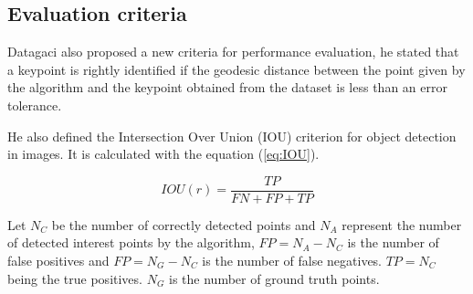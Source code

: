 \documentclass{comjnl}
\begin{document}
\subsection{Evaluation criteria}
Datagaci also proposed a new criteria for performance evaluation, he stated
that a keypoint is rightly identified if the geodesic distance between the
point given by the algorithm and the keypoint obtained from the dataset is
less than an error tolerance.

He also defined the Intersection Over Union (IOU) criterion for object
detection in images. It is calculated with the equation (\ref{eq:IOU}).

\begin{equation} \label{eq:IOU}
IOU(r) = \frac{TP}{FN + FP + TP}
\end{equation}

Let $N_{C}$ be the number of correctly detected points and $N_{A}$
represent the number of detected interest points by the algorithm,
$FP = N_{A} - N_{C}$ is the number of false positives and $FP = N_{G} - N_{C}$
is the number of false negatives. $TP = N_{C}$ being the true positives.
$N_{G}$ is the number of ground truth points.
\end{document}
